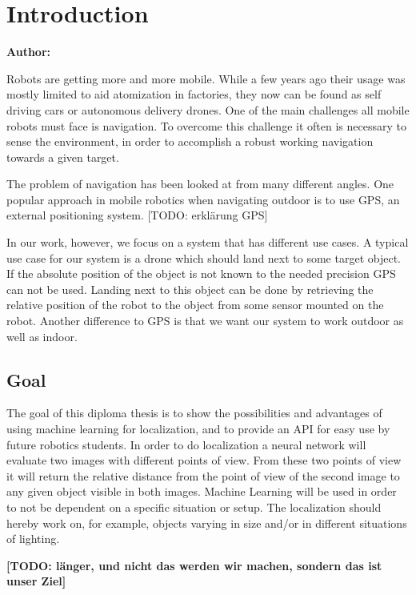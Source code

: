 \chapter{Introduction}

\textbf{Author:}

Robots are getting more and more mobile. While a few years ago their usage was mostly limited to aid atomization in factories, they now can be found as self driving cars or autonomous delivery drones.
One of the main challenges all mobile robots must face is navigation. To overcome this challenge it often is necessary to sense the environment, in order to accomplish a robust working navigation towards a given target.

The problem of navigation has been looked at from many different angles. One popular approach in mobile robotics when navigating outdoor is to use GPS, an external positioning system. [TODO: erklärung GPS]

In our work, however, we focus on a system that has different use cases. A typical use case for our system is a drone which should land next to some target object. If the absolute position of the object is not known to the needed precision GPS can not be used.
Landing next to this object can be done by retrieving the relative position of the robot to the object from some sensor mounted on the robot.
Another difference to GPS is that we want our system to work outdoor as well as indoor.

\section{Goal}
The goal of this diploma thesis is to show the possibilities and advantages of using machine learning for localization, and to provide an API for easy use by future robotics students. In order to do localization a neural network will evaluate two images with different points of view. From these two points of view it will return the relative distance from the point of view of the second image to any given object visible in both images. Machine Learning will be used in order to not be dependent on a specific situation or setup. The localization should hereby work on, for example, objects varying in size and/or in different situations of lighting.

\textbf{[TODO: länger, und nicht das werden wir machen, sondern das ist unser Ziel]}

\filbreak
